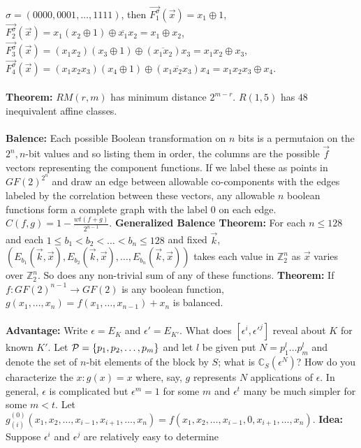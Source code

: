 $\sigma = (0000, 0001, \ldots , 1111)$, then
${\vec {F_1^{\sigma}}} ({\vec x})= x_1 \oplus 1$,
${\vec {F_2^{\sigma}}} ({\vec x})= x_1 (x_2 \oplus 1) \oplus {\overline {x_1}}x_2
= x_1 \oplus x_2$,
${\vec {F_3^{\sigma}}} ({\vec x})= (x_1 x_2) (x_3 \oplus 1) \oplus ({\overline {x_1 x_2}})x_3
= x_1 x_2 \oplus x_3$,
${\vec {F_4^{\sigma}}} ({\vec x})= (x_1 x_2 x_3 ) (x_4 \oplus 1) \oplus 
({\overline {x_1 x_2 x_3}}) x_4= x_1 x_2 x_3 \oplus x_4$.\\
\\
{\bf Theorem:} $RM(r,m)$ has minimum distance $2^{m-r}$.
$R(1,5)$ has $48$ inequivalent affine classes.
\\
\\
{\bf Balence:}
Each possible Boolean transformation on $n$ bits is a permutaion on the $2^n, n$-bit values
and so listing them in order, the columns are the possible ${\vec f}$ vectors representing the 
component functions.  If we label these as points in $GF(2)^{2^n}$ and draw an edge between
allowable co-components with the edges labeled by the correlation between these vectors,
any allowable $n$ boolean functions form a complete graph with the label $0$ on each edge.
$C(f,g)= 1-{\frac {wt(f+g)} {2^{n-1}}}$.  
{\bf Generalized Balence Theorem:} For each $n \le 128$ and each
$1 \le b_1 < b_2 < \ldots < b_n \le 128$ and fixed ${\vec k}$,
$(E_{b_1} ({\vec k}, {\vec x}), E_{b_2} ({\vec k}, {\vec x}), 
\ldots , E_{b_n} ({\vec k}, {\vec x}))$
takes each value in ${\mathbb Z}_2^n$ as ${\vec x}$ varies over
${\mathbb Z}_2^n$.  So does any non-trivial sum of any of these functions.
{\bf Theorem:}  If $f:GF(2)^{n-1} \rightarrow GF(2)$ is any boolean function,
$g(x_1, \ldots, x_n)= f(x_1, \ldots, x_{n-1})+x_n$ is balanced.
\\
\\
{\bf Advantage:}
Write $\epsilon= E_K$ and $\epsilon'= E_{K'}$.  What does $[\epsilon^i, {\epsilon'}^j]$ reveal
about $K$ for known $K'$.  Let ${\cal P}= \{ p_1 , p_2 , \ldots , p_m \}$ and let $l$ be given
put $N= p_1^l \ldots p_m^l$ and denote the set of $n$-bit elements of the block by
$S$;  what is ${\mathbb C}_S(\epsilon^N)$?  
How do you characterize the $x: g(x)=x$ where, say, $g$ represents $N$ applications of
$\epsilon$.  
In general, $\epsilon$ is complicated but
$\epsilon^m=1$ for some $m$ and
$\epsilon^t$ many be much simpler for some $m<t$.
Let $ g^{(0)}_{(i)}(x_1 , x_2 , \ldots , x_{i-1},x_{i+1}, \ldots, x_n)=
f(x_1 , x_2 , \ldots , x_{i-1},0,x_{i+1}, \ldots, x_n)$.  
{\bf Idea:} Suppose 
$\epsilon^i$ and $\epsilon^j$ are relatively easy to determine 
